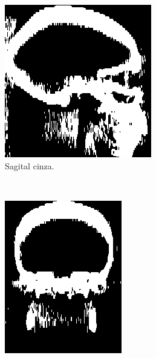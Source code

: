 \documentclass{article}
\begin{document}
\begin{figure}[H]
    \centering
    \begin{subfigure}[b]{0.3\textwidth}
        \includegraphics[width=\textwidth]{skull/_neuroradiologist-sagital-gray.png}
        \caption{Sagital cinza.}
    \end{subfigure}
    ~
    \begin{subfigure}[b]{0.3\textwidth}
        \includegraphics[width=\textwidth]{skull/neuroradiologist-coronal-gray.png}

\end{subfigure}
\end{figure}
\end{document}
